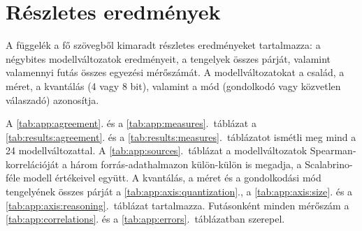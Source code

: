\documentclass[
]{elteikthesis}[2024/04/26]
\begin{document}
\chapter{Részletes eredmények}
\label{app:results}

A függelék a fő szövegből kimaradt részletes eredményeket tartalmazza: a négybites
modellváltozatok eredményeit, a tengelyek összes párját, valamint valamennyi futás összes
egyezési mérőszámát. A modellváltozatokat a család, a méret, a kvantálás (4 vagy 8 bit),
valamint a mód (gondolkodó vagy közvetlen válaszadó) azonosítja.

A \ref{tab:app:agreement}. és a \ref{tab:app:measures}.~táblázat a
\ref{tab:results:agreement}. és a \ref{tab:results:measures}.~táblázatot ismétli meg mind a 24
modellváltozattal. A \ref{tab:app:sources}.~táblázat a modellváltozatok Spearman-korrelációját
a három forrás-adathalmazon külön-külön is megadja, a Scalabrino-féle modell értékeivel együtt.
A kvantálás, a méret és a gondolkodási mód tengelyének összes párját a \ref{tab:app:axis:quantization}., a
\ref{tab:app:axis:size}. és a \ref{tab:app:axis:reasoning}.~táblázat tartalmazza. Futásonként minden mérőszám a
\ref{tab:app:correlations}. és a \ref{tab:app:errors}.~táblázatban szerepel.
\end{document}
